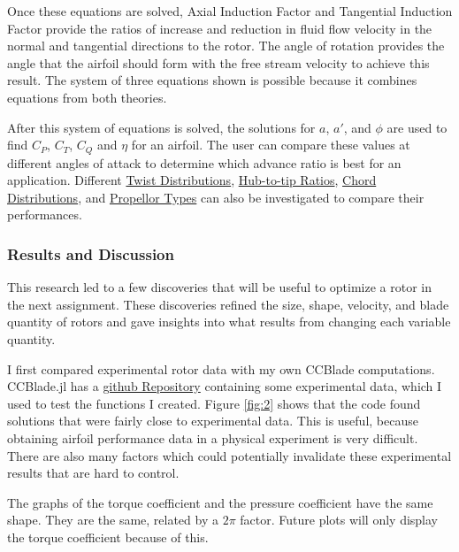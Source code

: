 \documentclass{article}
\begin{document}
Once these equations are solved, Axial Induction Factor and Tangential Induction Factor provide the ratios of increase and reduction in fluid flow velocity in the normal and tangential directions to the rotor. The angle of rotation provides the angle that the airfoil should form with the free stream velocity to achieve this result. The system of three equations shown is possible because it combines equations from both theories. \newline

After this system of equations is solved, the solutions for $a$, $a'$, and $\phi$ are used to find $C_{P}$, $C_{T}$, $C_{Q}$ and $\eta$ for an airfoil. The user can compare these values at different angles of attack to determine which advance ratio is best for an application. Different \hyperlink{T}{Twist Distributions}, \hyperlink{D/D}{Hub-to-tip Ratios}, \hyperlink{c}{Chord Distributions}, and \hyperlink{APC}{Propellor Types} can also be investigated to compare their performances. \newline

\subsubsection*{Results and Discussion}

This research led to a few discoveries that will be useful to optimize a rotor in the next assignment. These discoveries refined the size, shape, velocity, and blade quantity of rotors and gave insights into what results from changing each variable quantity. \newline

I first compared experimental rotor data with my own CCBlade computations. CCBlade.jl has a \href{https://github.com/byuflowlab/CCBlade.jl}{github Repository} containing some experimental data, which I used to test the functions I created. Figure \ref{fig:2} shows that the code found solutions that were fairly close to experimental data. This is useful, because obtaining airfoil performance data in a physical experiment is very difficult. There are also many factors which could potentially invalidate these experimental results that are hard to control. \newline

The graphs of the torque coefficient and the pressure coefficient have the same shape. They are the same, related by a $2 \pi$ factor. Future plots will only display the torque coefficient because of this.
\end{document}
